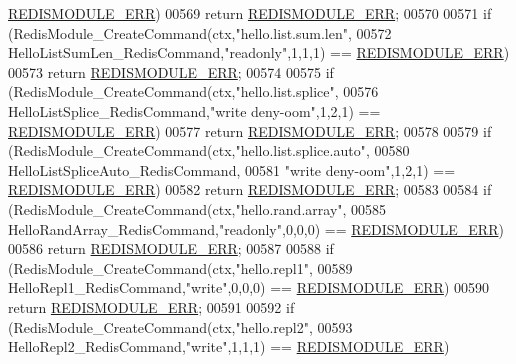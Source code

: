 \begin{DoxyCode}
{      \hyperlink{redismodule_8h_a3df6f5bd5247289e66f44437a7cddd49}{REDISMODULE\_ERR})
00569         \textcolor{keywordflow}{return} \hyperlink{redismodule_8h_a3df6f5bd5247289e66f44437a7cddd49}{REDISMODULE\_ERR};
00570 
00571     \textcolor{keywordflow}{if} (RedisModule\_CreateCommand(ctx,\textcolor{stringliteral}{"hello.list.sum.len"},
00572         HelloListSumLen\_RedisCommand,\textcolor{stringliteral}{"readonly"},1,1,1) == \hyperlink{redismodule_8h_a3df6f5bd5247289e66f44437a7cddd49}{REDISMODULE\_ERR})
00573         \textcolor{keywordflow}{return} \hyperlink{redismodule_8h_a3df6f5bd5247289e66f44437a7cddd49}{REDISMODULE\_ERR};
00574 
00575     \textcolor{keywordflow}{if} (RedisModule\_CreateCommand(ctx,\textcolor{stringliteral}{"hello.list.splice"},
00576         HelloListSplice\_RedisCommand,\textcolor{stringliteral}{"write deny-oom"},1,2,1) == 
      \hyperlink{redismodule_8h_a3df6f5bd5247289e66f44437a7cddd49}{REDISMODULE\_ERR})
00577         \textcolor{keywordflow}{return} \hyperlink{redismodule_8h_a3df6f5bd5247289e66f44437a7cddd49}{REDISMODULE\_ERR};
00578 
00579     \textcolor{keywordflow}{if} (RedisModule\_CreateCommand(ctx,\textcolor{stringliteral}{"hello.list.splice.auto"},
00580         HelloListSpliceAuto\_RedisCommand,
00581         \textcolor{stringliteral}{"write deny-oom"},1,2,1) == \hyperlink{redismodule_8h_a3df6f5bd5247289e66f44437a7cddd49}{REDISMODULE\_ERR})
00582         \textcolor{keywordflow}{return} \hyperlink{redismodule_8h_a3df6f5bd5247289e66f44437a7cddd49}{REDISMODULE\_ERR};
00583 
00584     \textcolor{keywordflow}{if} (RedisModule\_CreateCommand(ctx,\textcolor{stringliteral}{"hello.rand.array"},
00585         HelloRandArray\_RedisCommand,\textcolor{stringliteral}{"readonly"},0,0,0) == \hyperlink{redismodule_8h_a3df6f5bd5247289e66f44437a7cddd49}{REDISMODULE\_ERR})
00586         \textcolor{keywordflow}{return} \hyperlink{redismodule_8h_a3df6f5bd5247289e66f44437a7cddd49}{REDISMODULE\_ERR};
00587 
00588     \textcolor{keywordflow}{if} (RedisModule\_CreateCommand(ctx,\textcolor{stringliteral}{"hello.repl1"},
00589         HelloRepl1\_RedisCommand,\textcolor{stringliteral}{"write"},0,0,0) == \hyperlink{redismodule_8h_a3df6f5bd5247289e66f44437a7cddd49}{REDISMODULE\_ERR})
00590         \textcolor{keywordflow}{return} \hyperlink{redismodule_8h_a3df6f5bd5247289e66f44437a7cddd49}{REDISMODULE\_ERR};
00591 
00592     \textcolor{keywordflow}{if} (RedisModule\_CreateCommand(ctx,\textcolor{stringliteral}{"hello.repl2"},
00593         HelloRepl2\_RedisCommand,\textcolor{stringliteral}{"write"},1,1,1) == \hyperlink{redismodule_8h_a3df6f5bd5247289e66f44437a7cddd49}{REDISMODULE\_ERR})
}
\end{DoxyCode}
